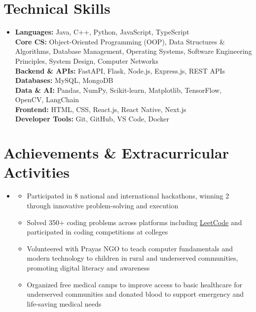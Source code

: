 \documentclass[letterpaper,11pt]{article}
\newcommand{\resumeItem}[1]{
    \item\small{#1}
}
\newcommand{\resumeSubHeadingListStart}{
    \begin{itemize}[
        leftmargin=0.15in,
        label={},
        topsep=0pt,
        partopsep=0pt,
        parsep=0pt,
        itemsep=2pt
    ]
}
\newcommand{\resumeSubHeadingListEnd}{
    \end{itemize}
}
\newcommand{\resumeItemListStart}{
    \begin{itemize}[
        leftmargin=0.18in,
        topsep=0pt,
        partopsep=0pt,
        parsep=0pt,
        itemsep=0pt
    ]
}
\newcommand{\resumeItemListEnd}{
    \end{itemize}
}
\begin{document}
\section{Technical Skills}

\resumeSubHeadingListStart
    \item
    \small{
        \textbf{Languages:} Java, C++, Python, JavaScript, TypeScript \\
        \textbf{Core CS:} Object-Oriented Programming (OOP), Data Structures \& Algorithms, Database Management, Operating Systems, Software Engineering Principles, System Design, Computer Networks \\
        \textbf{Backend \& APIs:} FastAPI, Flask, Node.js, Express.js, REST APIs \\
        \textbf{Databases:} MySQL, MongoDB \\
        \textbf{Data \& AI:} Pandas, NumPy, Scikit-learn, Matplotlib, TensorFlow, OpenCV, LangChain \\
        \textbf{Frontend:} HTML, CSS, React.js, React Native, Next.js \\
        \textbf{Developer Tools:} Git, GitHub, VS Code, Docker
    }
\resumeSubHeadingListEnd

\section{Achievements \& Extracurricular Activities}

\resumeSubHeadingListStart

    \item
    \resumeItemListStart
        \resumeItem{Participated in 8 national and international hackathons, winning 2 through innovative problem-solving and execution}
        \resumeItem{Solved 350+ coding problems across platforms including \href{https://leetcode.com/u/saadziaatharkhan/}{\underline{LeetCode}} and participated in coding competitions at colleges}
        \resumeItem{Volunteered with Prayas NGO to teach computer fundamentals and modern technology to children in rural and underserved communities, promoting digital literacy and awareness}
        \resumeItem{Organized free medical camps to improve access to basic healthcare for underserved communities and donated blood to support emergency and life-saving medical needs}
    \resumeItemListEnd

\resumeSubHeadingListEnd


\end{document}
